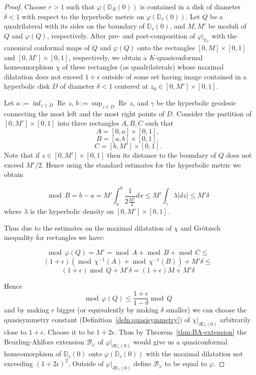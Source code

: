 \documentclass[10pt,reqno,a4paper]{amsart}
\numberwithin{figure}{section}
\numberwithin{equation}{section}
\renewcommand{\Re}{\operatorname{Re\,}}
\renewcommand{\mod}{\operatorname{mod\,}}
\begin{document}
\begin{proof}
	Choose $ r>1 $ such that $ \varphi(\mathbb{D}_R(0)) $ is contained in a disk of diameter $ \delta<1 $ with respect to the hyperbolic metric on $ \varphi (\mathbb{D}_r(0)) $. Let $ Q $ be a quadrilateral with its sides on the boundary of $ \mathbb{D}_r(0) $, and $ M,M' $ be moduli of $ Q $ and $ \varphi(Q) $, respectively. After pre- and post-composition of $ \varphi|_{\mathbb{D}_r} $ with the canonical conformal maps of $ Q $ and $ \varphi(Q) $ onto the rectangles $ [0,M]\times[0,1] $ and $ [0,M']\times[0,1] $, respectively, we obtain a $K$-quasiconformal homeomorphism $ \chi $ of these rectangles (as quadrilaterals) whose maximal dilatation does not exceed $ 1+\epsilon $ outside of some set having image contained in a hyperbolic disk $ D $ of diameter $ \delta<1 $ centered at $ z_0 \in [0,M']\times[0,1] $. 
	
	Let $ a:=\inf_{z\in D}\Re z,\, b:=\sup_{z\in D} \Re z$, and $\gamma $ be the hyperbolic geodesic connecting the most left and the most right points of $ D $. Consider the partition of $[0,M']\times[0,1]$ into three rectangles $A,B,C$ such that $$A=[0,a]\times[0,1],$$
	$$B=[a,b]\times[0,1],$$
	$$C=[b,M']\times[0,1].$$
	Note that if $z\in[0,M']\times[0,1]$ then its distance to the boundary of $Q$ does not exceed $M'/2$. Hence using the standard estimates for the hyperbolic metric we obtain
	
	$$ 
	\mod B=b-a=M'\int_{a}^{b}\frac{1}{2\frac{M'}{2}}dx\leq M'\int_{\gamma}\lambda|dz| \leq M'\delta
	$$
	where $ \lambda $ is the hyperbolic density on $ [0,M']\times[0,1] $.
	
	Thus due to the estimates on the maximal dilatation of $ \chi $ and Gr\"otzsch inequality for rectangles we have:
	
	$$ \mod \varphi(Q)=M'=\mod A+\mod B+\mod C\leq$$
	$$(1+\epsilon)(\mod\chi^{-1}(A)+\mod\chi^{-1}(B))+M'\delta\leq$$
	$$(1+\epsilon)\mod Q+M'\delta=(1+\epsilon)M+M'\delta
	$$
	
	Hence 
	$$ \mod \varphi(Q)\leq \frac{1+\epsilon}{1-\delta}\mod Q $$
	and by making $r$ bigger (or equivalently by making $\delta$ smaller) we can choose the quasisymmetry constant (Definition~\ref{defn:quasisymmetry}) of $ \chi|_{\partial\mathbb{D}_r(0)} $ arbitrarily close to $1+\epsilon$. Choose it to be $ 1+2\epsilon $. Thus by Theorem~\ref{thm:BA-extension} the Beurling-Ahlfors extension $\mathcal{B}_\varphi$ of $\varphi|_{\partial\mathbb{D}_r(0)}$ would give us a quasiconformal homeomorphism of $\mathbb{D}_r(0)$ onto $\varphi(\mathbb{D}_r(0))$ with the maximal dilatation not exceeding $(1+2\epsilon)^2 $. Outside of $\varphi|_{\partial\mathbb{D}_r(0)}$ define $\mathcal{B}_\varphi$ to be equal to $\varphi$.
	

\end{proof}
\end{document}

